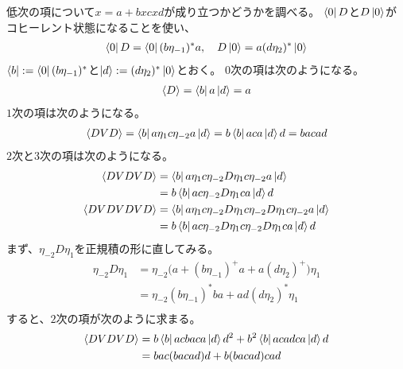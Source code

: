 {	低次の項について$x=a+bxcxd$が成り立つかどうかを調べる。
	$\mathinner{\langle{0}|}D$と$D\mathinner{|{0}\rangle}$がコヒーレント状態になることを使い、
	\begin{equation*}\begin{split}
		\mathinner{\langle{0}|}D = \mathinner{\langle{0}|}(b\eta_{-1})^*a,\quad D\mathinner{|{0}\rangle} = a(d\eta_2)^*\mathinner{|{0}\rangle}
	\end{split}\end{equation*}
	$\mathinner{\langle{b}|}:=\mathinner{\langle{0}|}(b\eta_{-1})^*$と$\mathinner{|{d}\rangle}:=(d\eta_{2})^*\mathinner{|{0}\rangle}$とおく。
	$0$次の項は次のようになる。
	\begin{equation*}\begin{split}
		\mathinner{\langle{D}\rangle} = \mathinner{\langle{b}|}a\mathinner{|{d}\rangle} = a
	\end{split}\end{equation*}
	$1$次の項は次のようになる。
	\begin{equation*}\begin{split}
		\mathinner{\langle{DVD}\rangle} = \mathinner{\langle{b}|}a\eta_{1}c\eta_{-2}a\mathinner{|{d}\rangle} = b\mathinner{\langle{b}|}aca\mathinner{|{d}\rangle}d
		= bacad
	\end{split}\end{equation*}
	$2$次と$3$次の項は次のようになる。
	\begin{equation*}\begin{split}
		\mathinner{\langle{DVDVD}\rangle} 
		&= \mathinner{\langle{b}|}a\eta_{1}c\eta_{-2}D\eta_{1}c\eta_{-2}a\mathinner{|{d}\rangle} \\
		&= b\mathinner{\langle{b}|}ac\eta_{-2}D\eta_{1}ca\mathinner{|{d}\rangle}d \\
		\mathinner{\langle{DVDVDVD}\rangle} 
		&= \mathinner{\langle{b}|}a\eta_{1}c\eta_{-2}D\eta_{1}c\eta_{-2}D\eta_{1}c\eta_{-2}a\mathinner{|{d}\rangle} \\
		&= b\mathinner{\langle{b}|}ac\eta_{-2}D\eta_{1}c\eta_{-2}D\eta_{1}ca\mathinner{|{d}\rangle}d \\
	\end{split}\end{equation*}
	まず、$\eta_{-2}D\eta_{1}$を正規積の形に直してみる。
	\begin{equation*}\begin{split}
		\eta_{-2}D\eta_{1} 
		&= \eta_{-2}\bigl(a + (b\eta_{-1})^+a + a(d\eta_{2})^+\bigr)\eta_{1} \\
		&= \eta_{-2}(b\eta_{-1})^*ba + ad(d\eta_{2})^*\eta_{1} \\
	\end{split}\end{equation*}
	すると、$2$次の項が次のように求まる。
	\begin{equation*}\begin{split}
		\braket{DVDVD} 
		&= b\bra{b}acbaca\ket{d}d^2 + b^2\bra{b}acadca\ket{d}d \\
		&= bac(bacad)d + b(bacad)cad \\

\end{split}
\end{equation*}}
